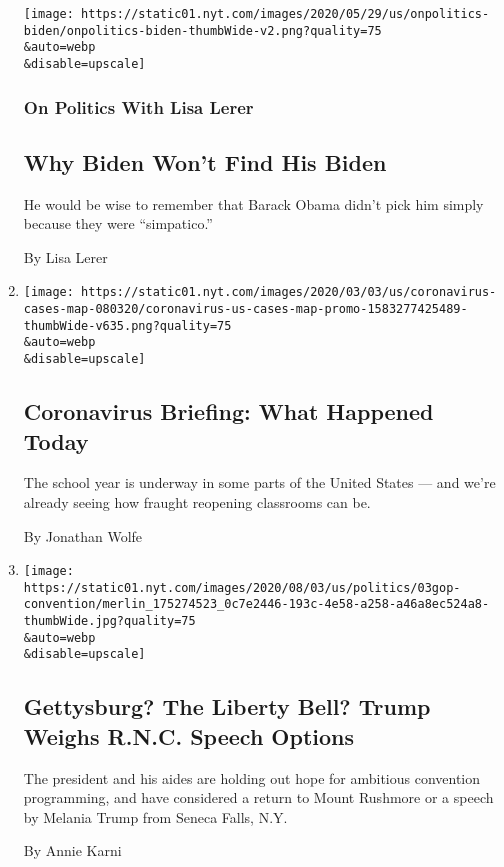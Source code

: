 \begin{enumerate}
  \texttt{[image: https://static01.nyt.com/images/2020/05/29/us/onpolitics-biden/onpolitics-biden-thumbWide-v2.png?quality=75\\\&auto=webp\\\&disable=upscale]}

  \hypertarget{on-politics-with-lisa-lerer}{%
  \subsubsection{On Politics With Lisa
  Lerer}\label{on-politics-with-lisa-lerer}}

  \hypertarget{why-biden-wont-find-his-biden}{%
  \subsection{Why Biden Won't Find His
  Biden}\label{why-biden-wont-find-his-biden}}

  He would be wise to remember that Barack Obama didn't pick him simply
  because they were ``simpatico.''

  By Lisa Lerer
\item
  \href{/2020/08/03/us/coronavirus-today.html}{}

  \texttt{[image: https://static01.nyt.com/images/2020/03/03/us/coronavirus-cases-map-080320/coronavirus-us-cases-map-promo-1583277425489-thumbWide-v635.png?quality=75\\\&auto=webp\\\&disable=upscale]}

  \hypertarget{coronavirus-briefing-what-happened-today}{%
  \subsection{Coronavirus Briefing: What Happened
  Today}\label{coronavirus-briefing-what-happened-today}}

  The school year is underway in some parts of the United States --- and
  we're already seeing how fraught reopening classrooms can be.

  By Jonathan Wolfe
\item
  \href{/2020/08/03/us/politics/trump-rnc-speech.html}{}

  \texttt{[image: https://static01.nyt.com/images/2020/08/03/us/politics/03gop-convention/merlin\_175274523\_0c7e2446-193c-4e58-a258-a46a8ec524a8-thumbWide.jpg?quality=75\\\&auto=webp\\\&disable=upscale]}

  \hypertarget{gettysburg-the-liberty-bell-trump-weighs-rnc-speech-options}{%
  \subsection{Gettysburg? The Liberty Bell? Trump Weighs R.N.C. Speech
  Options}\label{gettysburg-the-liberty-bell-trump-weighs-rnc-speech-options}}

  The president and his aides are holding out hope for ambitious
  convention programming, and have considered a return to Mount Rushmore
  or a speech by Melania Trump from Seneca Falls, N.Y.

  By Annie Karni
\end{enumerate}

